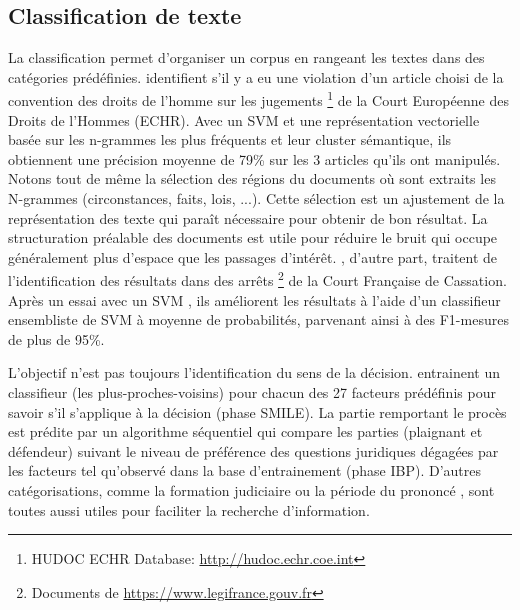 
\subsection{Classification de texte}
La classification permet d'organiser un corpus en rangeant les textes dans des catégories prédéfinies.  \cite{Aletras2016predictDecisionECHR} identifient s'il y a eu une violation d'un article choisi de la convention des droits de l'homme sur les jugements \footnote{HUDOC ECHR Database: \url{http://hudoc.echr.coe.int}} de la Court Européenne des Droits de l'Hommes (ECHR). Avec un SVM et une représentation vectorielle basée sur les n-grammes les plus fréquents et leur cluster sémantique, ils obtiennent une précision moyenne de 79\% sur les 3 articles qu'ils ont manipulés. Notons tout de même la sélection des régions du documents où sont extraits les N-grammes (circonstances, faits, lois, ...). Cette sélection est un ajustement de la représentation des texte qui paraît nécessaire pour obtenir de bon résultat. La structuration préalable des documents est utile pour réduire le bruit qui occupe généralement plus d'espace que les passages d'intérêt. \cite{sulea2017legalEnsSVM}, d'autre part, traitent de l'identification des résultats dans des arrêts \footnote{Documents de \url{https://www.legifrance.gouv.fr}} de la Court Française de Cassation. Après un essai avec un SVM \citep{Sulea2017predictareadecision}, ils améliorent les résultats à l'aide d'un classifieur ensembliste de SVM à moyenne de probabilités, parvenant ainsi à des F1-mesures de plus de 95\%. 

L'objectif n'est pas toujours l'identification du sens de la décision. \cite{Ashley2009classifCases} entrainent un classifieur (les plus-proches-voisins) pour chacun des 27 facteurs prédéfinis pour savoir s'il s'applique à la décision (phase SMILE). La partie remportant le procès est prédite par un algorithme séquentiel qui compare les parties (plaignant et défendeur) suivant le niveau de préférence des questions juridiques dégagées par les facteurs tel qu'observé dans la base d'entrainement (phase IBP).  D'autres catégorisations, comme la formation judiciaire ou la période du prononcé \citep{Sulea2017predictareadecision,sulea2017legalEnsSVM}, sont toutes aussi utiles pour faciliter la recherche d'information.

